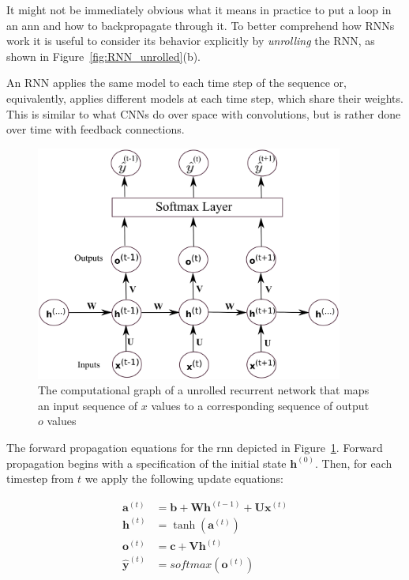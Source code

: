 It might not be immediately obvious what it means in practice to put a loop in an \gls{ann} and how to backpropagate through it. To better comprehend how RNNs work it is useful to consider its behavior explicitly by \emph{unrolling} the RNN, as shown in Figure~\ref{fig:RNN_unrolled}(b).

An RNN applies the same model to each time step of the sequence or, equivalently, applies different models at each time step, which share their weights. This is similar to what CNNs do over space with convolutions, but is rather done over time with feedback connections.

\begin{figure}
	\centering
	\includegraphics[width=0.9\textwidth]{figures/rnn_unrolling.eps}
	\caption{The computational graph of a unrolled recurrent network that maps an input sequence of $ x $ values to a corresponding sequence of output $ o $ values \label{fig:RNN_unrolling}}
\end{figure}

The forward propagation equations for the \gls{rnn} depicted in Figure~\ref{fig:RNN_unrolling}. Forward propagation begins with a specification of the initial state $ \textbf{h}^{(0)} $. Then, for each timestep from $ t $ we apply the following update equations:

\begin{equation} \label{rnn_unroll}
\begin{split}
	\textbf{a}^{(t)} &= \textbf{b} + \textbf{W}\textbf{h}^{(t-1)} + \textbf{U}\textbf{x}^{(t)} \\
	\textbf{h}^{(t)}&=\tanh(\textbf{a}^{(t)})\\
	\textbf{o}^{(t)}&= \textbf{c} + \textbf{V}\textbf{h}^{(t)} \\
	{\hat{\textbf{y}}}^{(t)} &= softmax(\textbf{o}^{(t)})
\end{split}
\end{equation}

